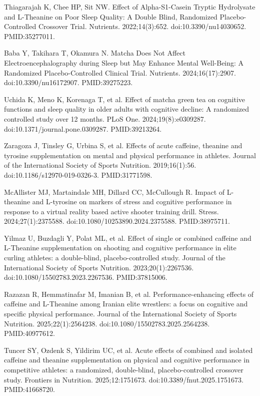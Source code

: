 \documentclass[12pt,oneside]{book}
\newcommand{\reff}[2]{\par\hangindent=7mm\hangafter=1\noindent[#1]\hspace{2mm}#2\par}
\begin{document}
\reff{53}{Thiagarajah K, Chee HP, Sit NW. Effect of Alpha-S1-Casein Tryptic Hydrolysate and L-Theanine on Poor Sleep Quality: A Double Blind, Randomized Placebo-Controlled Crossover Trial. Nutrients. 2022;14(3):652. doi:10.3390/nu14030652. PMID:35277011.}

\reff{54}{Baba Y, Takihara T, Okamura N. Matcha Does Not Affect Electroencephalography during Sleep but May Enhance Mental Well-Being: A Randomized Placebo-Controlled Clinical Trial. Nutrients. 2024;16(17):2907. doi:10.3390/nu16172907. PMID:39275223.}

\reff{55}{Uchida K, Meno K, Korenaga T, et al. Effect of matcha green tea on cognitive functions and sleep quality in older adults with cognitive decline: A randomized controlled study over 12 months. PLoS One. 2024;19(8):e0309287. doi:10.1371/journal.pone.0309287. PMID:39213264.}

\reff{56}{Zaragoza J, Tinsley G, Urbina S, et al. Effects of acute caffeine, theanine and tyrosine supplementation on mental and physical performance in athletes. Journal of the International Society of Sports Nutrition. 2019;16(1):56. doi:10.1186/s12970-019-0326-3. PMID:31771598.}

\reff{57}{McAllister MJ, Martaindale MH, Dillard CC, McCullough R. Impact of L-theanine and L-tyrosine on markers of stress and cognitive performance in response to a virtual reality based active shooter training drill. Stress. 2024;27(1):2375588. doi:10.1080/10253890.2024.2375588. PMID:38975711.}

\reff{58}{Yilmaz U, Buzdagli Y, Polat ML, et al. Effect of single or combined caffeine and L-Theanine supplementation on shooting and cognitive performance in elite curling athletes: a double-blind, placebo-controlled study. Journal of the International Society of Sports Nutrition. 2023;20(1):2267536. doi:10.1080/15502783.2023.2267536. PMID:37815006.}

\reff{59}{Razazan R, Hemmatinafar M, Imanian B, et al. Performance-enhancing effects of caffeine and L-Theanine among Iranian elite wrestlers: a focus on cognitive and specific physical performance. Journal of the International Society of Sports Nutrition. 2025;22(1):2564238. doi:10.1080/15502783.2025.2564238. PMID:40977612.}

\reff{60}{Tuncer SY, Ozdenk S, Yildirim UC, et al. Acute effects of combined and isolated caffeine and theanine supplementation on physical and cognitive performance in competitive athletes: a randomized, double-blind, placebo-controlled crossover study. Frontiers in Nutrition. 2025;12:1751673. doi:10.3389/fnut.2025.1751673. PMID:41668720.}
\end{document}
